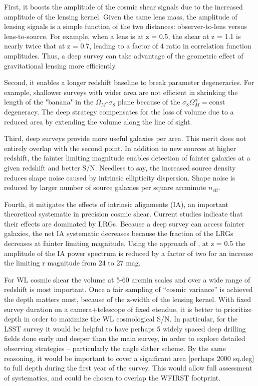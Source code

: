 First, it boosts the amplitude of the cosmic shear signals due to the increased
amplitude of the lensing kernel.  Given the same lens mass, the amplitude of
lensing signals is a simple function of the two distances: observer-to-lens
versus lens-to-source. For example, when a lens is at z = 0.5, the shear at z =
1.1 is nearly twice that at z = 0.7, leading to a factor of 4 ratio in
correlation function amplitudes.  Thus, a deep survey can take advantage of the
geometric effect of gravitational lensing more efficiently.

Second, it enables a longer redshift baseline to break parameter degeneracies.
For example, shallower surveys with wider area are not efficient in shrinking
the length of the "banana" in the $\Omega_M$-$\sigma_8$ plane because of the
$\sigma_8 \Omega_M^\alpha = \mathrm{const}$ degeneracy.  The deep strategy
compensates for the loss of volume due to a reduced area by extending the volume
along the line of sight.

Third, deep surveys provide more useful galaxies per area.  This merit does not
entirely overlap with the second point.  In addition to new sources at higher
redshift, the fainter limiting magnitude enables detection of fainter galaxies
at a given redshift and better S/N.  Needless to say, the increased source
density reduces shape noise caused by intrinsic ellipticity dispersion.  Shape
noise is reduced by larger number of source galaxies per square arcminute
$n_\mathrm{eff}$.

Fourth, it mitigates the effects of intrinsic alignments (IA), an important
theoretical systematic in precision cosmic shear.  Current studies
\citep{Heymans2013} indicate that their effects are dominated by LRGs.  Because
a deep survey can access fainter galaxies, the net IA systematic decreases
because the fraction of the LRGs decreases at fainter limiting magnitude. Using
the approach of \citet{Joachimi2011},  at z = 0.5 the amplitude of the IA power
spectrum is reduced by a factor of two for an increase the limiting r magnitude
from 24 to 27 mag.

For WL cosmic shear the volume at 5-60 arcmin scales and over a wide range of
redshift is most important. Once a fair sampling of “cosmic variance” is
achieved the depth matters most, because of the z-width of the lensing kernel.
With fixed survey duration on a camera+telescope of fixed etendue, it is better
to prioritize depth in order to maximize the WL cosmological S/N.  In
particular, for the LSST survey it would be helpful to have perhaps 5 widely
spaced deep drilling fields done early and deeper than the main survey, in order
to explore detailed observing strategies -- particularly the angle dither
scheme.  By the same reasoning, it would be important to cover a significant
area [perhaps 2000 sq.deg] to full depth during the first year of the survey.
This would allow full assessment of systematics, and could be chosen to overlap
the WFIRST footprint.



